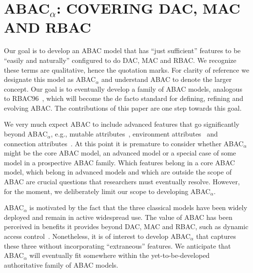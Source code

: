 \section{ABAC$_{\alpha}$: COVERING DAC, MAC AND RBAC}

Our goal is to develop an ABAC model that has ``just sufficient'' features to be ``easily and naturally'' configured to do DAC, MAC and RBAC.  We recognize these terms are qualitative,  hence the quotation marks.  For clarity of reference we designate this model as
ABAC$_{\alpha}$ and understand ABAC to denote the larger concept.  Our goal is to eventually develop  a family of ABAC models, analogous to RBAC96~\cite{SandhuRBAC96}, which will become the de facto standard for defining, refining and evolving ABAC.  The contributions of this paper are one step towards this goal.

We very much expect ABAC to include advanced features that go significantly beyond ABAC$_{\alpha}$, e.g., mutable attributes~\cite{ucon}, environment attributes~\cite{yuanandtong} and connection attributes~\cite{ksb11}.
At this point it is premature to consider whether ABAC$_{\alpha}$ might be the core ABAC model, an advanced model or a special case of some model in a prospective ABAC family.
Which features belong in a core ABAC model, which belong in advanced models and which are outside the scope of ABAC are crucial questions that researchers must eventually resolve.  However, for the moment, we deliberately limit our scope to developing ABAC$_{\alpha}$.

ABAC$_{\alpha}$ is motivated by the fact that the three
classical models have been widely deployed and remain in active widespread use.
The value of ABAC has been perceived in benefits it provides beyond DAC, MAC and RBAC,
such as dynamic access control~\cite{pernul-2006}. Nonetheless, it is of interest to develop ABAC$_{\alpha}$ that captures these three without incorporating ``extraneous'' features. We anticipate that ABAC$_{\alpha}$ will eventually fit somewhere within the yet-to-be-developed authoritative family of ABAC models.

